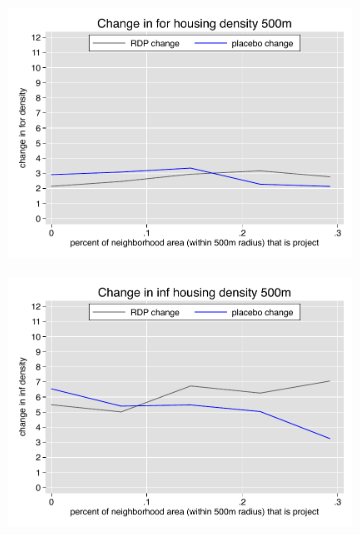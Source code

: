 \documentclass[12pt]{article}
\begin{document}
\begin{figure}
        \begin{subfigure}[b]{0.495\textwidth}
            \centering
            \includegraphics[width=\textwidth,trim={0.3cm .3cm 0.1cm 0cm}, clip=true]{figures/change_for_500_total.pdf}
        \end{subfigure}
        \hfill
        \begin{subfigure}[b]{0.495\textwidth}  
            \centering 
            \includegraphics[width=\textwidth,trim={0.3cm .3cm 0.1cm 0cm}, clip=true]{figures/change_inf_500_total.pdf}
        \end{subfigure}
        \vspace{-6mm}
  \end{figure} 
\end{document}
